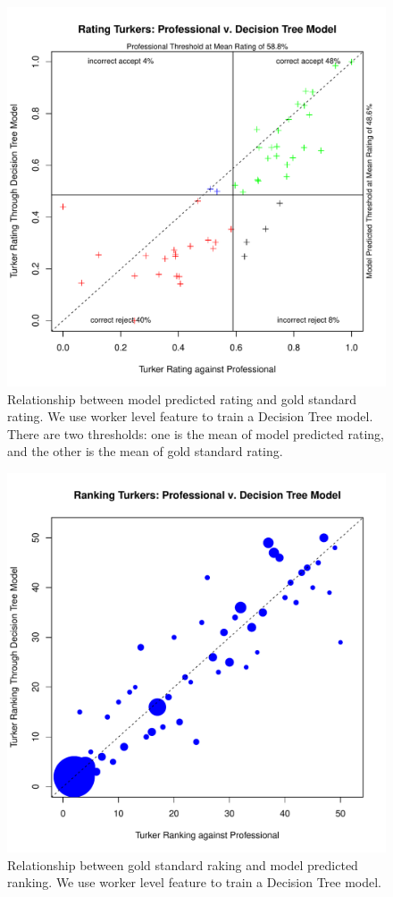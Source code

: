 \documentclass[11pt]{article}
\begin{document}
\begin{figure}[htbp]
  \centering
  \includegraphics[width=\linewidth]{Workerfeature/rrankingworkerfeaturedt2.pdf}
  \caption{Relationship between model predicted rating and gold standard rating. We use worker level feature to train a Decision Tree model. There are two thresholds: one is the mean of model predicted rating, and the other is the mean of gold standard rating.}
    \label{fdtworkerrrating2}
\end{figure}

\begin{figure}[htbp]
  \centering
  \includegraphics[width=\linewidth]{Workerfeature/workerfeatureorderdt.pdf}
  \caption{Relationship between gold standard raking and model predicted ranking. We use worker level feature to train a Decision Tree model. }
    \label{fdtworkerorder}
\end{figure}
\end{document}
